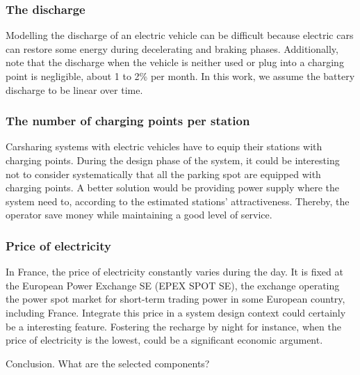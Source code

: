 \begin{bibunit}[ieeetr]

\subsubsection{The discharge}
Modelling the discharge of an electric vehicle can be difficult because electric cars can restore some energy during decelerating and braking phases.
Additionally, note that the discharge when the vehicle is neither used or plug into a charging point is negligible, about 1 to 2\% per month.
In this work, we assume the battery discharge to be linear over time.

\subsubsection{The number of charging points per station}
Carsharing systems with electric vehicles have to equip their stations with charging points.
During the design phase of the system, it could be interesting not to consider systematically that all the parking spot are equipped with charging points. 
A better solution would be providing power supply where the system need to, according to the estimated stations' attractiveness.
Thereby, the operator save money while maintaining a good level of service.


\subsubsection{Price of electricity}
In France, the price of electricity constantly varies during the day.
It is fixed at the European Power Exchange SE (EPEX SPOT SE), the exchange operating the power spot market for short-term trading power in some European country, including France.
Integrate this price in a system design context could certainly be a interesting feature.
Fostering the recharge by night for instance, when the price of electricity is the lowest, could be a significant  economic argument.


\bigskip
Conclusion. What are the selected components?



\end{bibunit}
